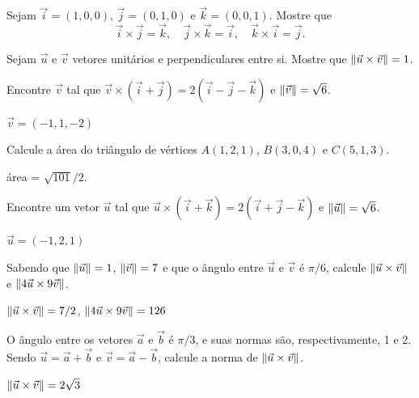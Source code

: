 \documentclass[12pt]{exam}
\begin{document}
\begin{exercicio}
    Sejam $\vec{i} = (1,0,0)$, $\vec{j} = (0,1,0)$ e $\vec{k} = (0,0,1)$. Mostre que
    \[
        \vec{i}\times\vec{j} = \vec{k},\quad \vec{j}\times\vec{k} = \vec{i},\quad \vec{k}\times\vec{i} = \vec{j}.
    \]
\end{exercicio}

\begin{exercicio}
    Sejam $\vec{u}$ e $\vec{v}$ vetores unitários e perpendiculares entre si. Mostre que $\left\Vert{\vec{u}\times\vec{v}}\right\Vert = 1$.
\end{exercicio}

\begin{exercicio}
    Encontre $\vec{v}$ tal que $\vec{v} \times (\vec{i} + \vec{j}) = 2(\vec{i} - \vec{j} - \vec{k})$ e $\left\Vert{\vec{v}}\right\Vert = \sqrt{6}$.
    \begin{solucao}
        $\vec{v} = (-1, 1, -2)$
    \end{solucao}
\end{exercicio}

\begin{exercicio}
    Calcule a área do triângulo de vértices $A(1,2,1)$, $B(3,0,4)$ e $C(5,1,3)$.
    \begin{solucao}
        área = $\sqrt{101}/2$.
    \end{solucao}
\end{exercicio}

\begin{exercicio}
    Encontre um vetor $\vec{u}$ tal que $\vec{u}\times(\vec{i} + \vec{k}) = 2(\vec{i} + \vec{j} - \vec{k})$ e $\left\Vert{\vec{u}}\right\Vert = \sqrt{6}$.
    \begin{solucao}
        $\vec{u} = (-1,2,1)$
    \end{solucao}
\end{exercicio}

\begin{exercicio}
    Sabendo que $\left\Vert{\vec{u}}\right\Vert = 1$, $\left\Vert{\vec{v}}\right\Vert = 7$ e que o ângulo entre $\vec{u}$ e $\vec{v}$ é $\pi/6$, calcule $\left\Vert{\vec{u}\times\vec{v}}\right\Vert$ e $\left\Vert{4\vec{u}\times9\vec{v}}\right\Vert$.
    \begin{solucao}
        $\left\Vert{\vec{u}\times\vec{v}}\right\Vert = 7/2$, $\left\Vert{4\vec{u}\times9\vec{v}}\right\Vert = 126$
    \end{solucao}
\end{exercicio}

\begin{exercicio}
    O ângulo entre os vetores $\vec{a}$ e $\vec{b}$ é $\pi/3$, e suas normas são, respectivamente, 1 e 2. Sendo $\vec{u} = \vec{a} + \vec{b}$ e $\vec{v} = \vec{a} - \vec{b}$, calcule a norma de $\left\Vert{\vec{u}\times\vec{v}}\right\Vert$.
    \begin{solucao}
        $\left\Vert{\vec{u}\times\vec{v}}\right\Vert = 2\sqrt{3}$
    \end{solucao}
\end{exercicio}
\end{document}
